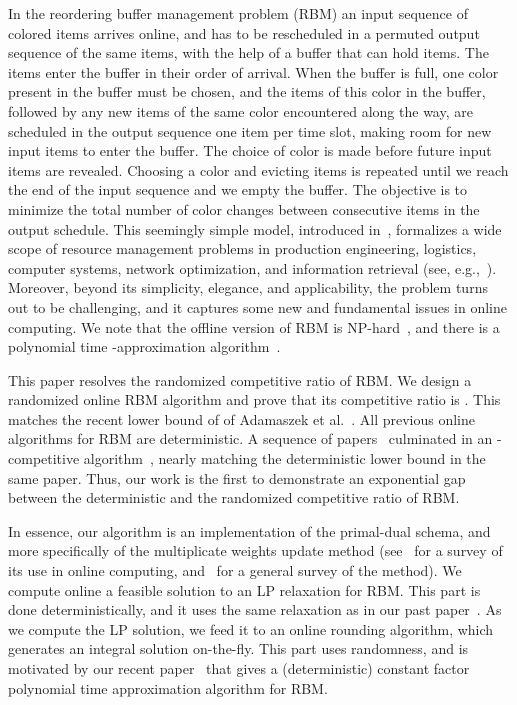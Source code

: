 \documentclass[12pt]{article}
\begin{document}
In the reordering buffer management problem (RBM) an input
sequence of colored items arrives online, and has to be rescheduled 
in a permuted output sequence of the same items, with the help 
of a buffer that can hold  items. The items enter the buffer 
in their order of arrival. When the buffer is full, one color present
in the buffer must be chosen, and the items of this color in the
buffer, followed by any new items of the same color encountered 
along the way, are scheduled in the output sequence one item
per time slot, making room for new input items to enter the
buffer. The choice of color is made before future input items 
are revealed. Choosing a color
and evicting items is repeated until we reach the end of the 
input sequence and we empty the buffer. The objective is to 
minimize the total number of color changes between consecutive 
items in the output schedule. This seemingly simple model, 
introduced in~\cite{RSW02}, formalizes a wide scope of resource 
management problems in production engineering, logistics, 
computer systems, network optimization, and information retrieval 
(see, e.g.,~\cite{RSW02,BB02,KRSW04,GSV04}). Moreover, 
beyond its simplicity, elegance, and applicability, the problem
turns out to be challenging, and it captures some new and 
fundamental issues in online computing. We note that the
offline version of RBM is NP-hard~\cite{AKM10,CMSS10}, and
there is a polynomial time -approximation algorithm~\cite{AR13}.

This paper resolves the randomized competitive ratio of RBM.
We design a randomized online RBM algorithm and prove that
its competitive ratio is . This matches the
recent lower bound of  of Adamaszek
et al.~\cite{ACER11}.
All previous online algorithms for RBM are deterministic. A
sequence of papers~\cite{RSW02,EW05,AR10,ACER11}
culminated in an 
-competitive algorithm~\cite{ACER11},
nearly matching the deterministic lower bound in the same
paper. Thus, our work is the first to demonstrate an
exponential gap between the deterministic and the randomized 
competitive ratio of RBM.

In essence, our algorithm is an implementation of the primal-dual 
schema, and more specifically of the multiplicate weights update
method (see~\cite{BN09} for a survey of its use in online computing,
and~\cite{AHK12} for a general survey of the method). 
We compute online a feasible solution 
to an LP relaxation
for RBM. This part is done deterministically, and it uses the same
relaxation as in our past paper~\cite{AR10}. As we compute the LP 
solution, we feed it to an online rounding algorithm, which generates 
an integral solution on-the-fly. This part uses randomness, and is
motivated by our recent paper~\cite{AR13} that gives a (deterministic)
constant factor polynomial time approximation algorithm for RBM.
\end{document}
